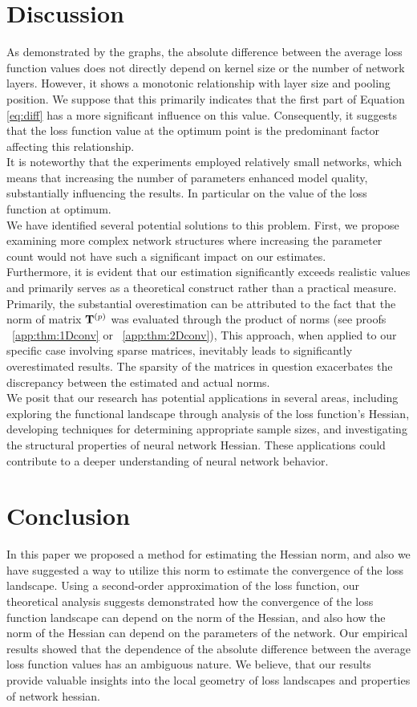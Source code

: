 \documentclass[conference]{IEEEtran}
\begin{document}
\section{Discussion}\label{sec:disc}
As demonstrated by the graphs, the absolute difference between the average loss function values does not directly depend on kernel size or the number of network layers. However, it shows a monotonic relationship with layer size and pooling position. We suppose that this primarily indicates that the first part of Equation \eqref{eq:diff} has a more significant influence on this value. Consequently, it suggests that the loss function value at the optimum point is the predominant factor affecting this relationship. \\
It is noteworthy that the experiments employed relatively small networks, which means that increasing the number of parameters enhanced model quality, substantially influencing the results. In particular on the value of the loss function at optimum. \\
We have identified several potential solutions to this problem. First, we propose examining more complex network structures where increasing the parameter count would not have such a significant impact on our estimates. \\
Furthermore, it is evident that our estimation significantly exceeds realistic values and primarily serves as a theoretical construct rather than a practical measure. Primarily, the substantial overestimation can be attributed to the fact that the norm of matrix $\mathbf{T}^{(p)}$ was evaluated through the product of norms (see proofs ~\ref{app:thm:1Dconv} or ~\ref{app:thm:2Dconv}), This approach, when applied to our specific case involving sparse matrices, inevitably leads to significantly overestimated results. The sparsity of the matrices in question exacerbates the discrepancy between the estimated and actual norms. \\
We posit that our research has potential applications in several areas, including exploring the functional landscape through analysis of the loss function's Hessian, developing techniques for determining appropriate sample sizes, and investigating the structural properties of neural network Hessian. These applications could contribute to a deeper understanding of neural network behavior.

\section{Conclusion}\label{sec:concl}
In this paper we proposed a method for estimating the Hessian norm, and also we have suggested a way to utilize this norm to estimate the convergence of the loss landscape. Using a second-order approximation of the loss function, our theoretical analysis suggests demonstrated how the convergence of the loss function landscape can depend on the norm of the Hessian, and also how the norm of the Hessian can depend on the parameters of the network. Our empirical results showed that the dependence of the absolute difference between the average loss function values has an ambiguous nature. We believe, that our results provide valuable insights into the local geometry of loss landscapes and properties of network hessian.
\end{document}
